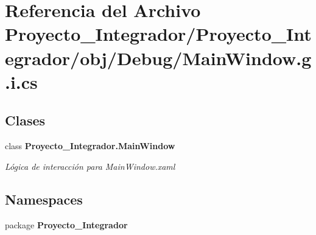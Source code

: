 \section{Referencia del Archivo Proyecto\-\_\-\-Integrador/\-Proyecto\-\_\-\-Integrador/obj/\-Debug/\-Main\-Window.g.\-i.\-cs}
\label{_main_window_8g_8i_8cs}
\subsection*{Clases}
\begin{DoxyCompactItemize}
\item 
class {\bf Proyecto\-\_\-\-Integrador.\-Main\-Window}
\begin{DoxyCompactList}\small\item\em Lógica de interacción para Main\-Window.\-xaml \end{DoxyCompactList}\end{DoxyCompactItemize}
\subsection*{Namespaces}
\begin{DoxyCompactItemize}
\item 
package {\bf Proyecto\-\_\-\-Integrador}
\end{DoxyCompactItemize}

